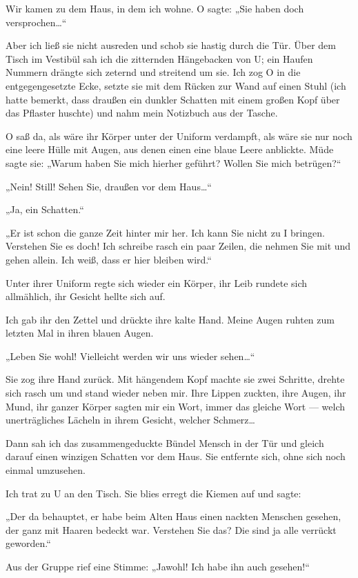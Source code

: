 Wir kamen zu dem Haus, in dem ich wohne. O
sagte: „Sie haben doch versprochen\ldots{}“

Aber ich ließ sie nicht ausreden und schob sie hastig durch die
Tür. Über dem Tisch im Vestibül sah ich die zitternden Hängebacken
von U; ein Haufen Nummern drängte sich zeternd und streitend um
sie. Ich zog O in die entgegengesetzte Ecke, setzte sie mit dem
Rücken zur Wand auf einen Stuhl (ich hatte bemerkt, dass draußen
ein dunkler Schatten mit einem großen Kopf über das Pflaster
huschte) und nahm mein Notizbuch aus der Tasche.

O saß da, als wäre
ihr Körper unter der Uniform verdampft, als wäre sie nur noch eine
leere Hülle mit Augen, aus denen einen eine blaue Leere anblickte.
Müde sagte sie: „Warum haben Sie mich hierher geführt? Wollen Sie
mich betrügen?“

„Nein! Still! Sehen Sie, draußen vor dem Haus\ldots{}“

„Ja, ein Schatten.“

„Er ist schon die ganze Zeit hinter mir her. Ich kann Sie nicht zu
I bringen. Verstehen Sie es doch! Ich schreibe rasch ein paar
Zeilen, die nehmen Sie mit und gehen allein. Ich weiß, dass er hier
bleiben wird.“

Unter ihrer Uniform regte sich wieder ein Körper,
ihr Leib rundete sich allmählich, ihr Gesicht hellte sich auf.

Ich gab ihr den Zettel und drückte ihre kalte Hand. Meine Augen
ruhten zum letzten Mal in ihren blauen Augen.

„Leben Sie wohl! Vielleicht werden wir uns wieder sehen\ldots{}“

Sie zog ihre Hand zurück. Mit hängendem Kopf machte sie zwei
Schritte, drehte sich rasch um und stand wieder neben mir. Ihre
Lippen zuckten, ihre Augen, ihr Mund, ihr ganzer Körper sagten mir
ein Wort, immer das gleiche Wort — welch unerträgliches Lächeln in
ihrem Gesicht, welcher Schmerz\ldots{}

Dann sah ich das zusammengeduckte Bündel Mensch in der Tür und
gleich darauf einen winzigen Schatten vor dem Haus. Sie entfernte
sich, ohne sich noch einmal umzusehen.

Ich trat zu U an den Tisch. Sie blies erregt die Kiemen auf und
sagte:

„Der da behauptet, er habe beim Alten Haus einen nackten Menschen
gesehen, der ganz mit Haaren bedeckt war. Verstehen Sie das? Die
sind ja alle verrückt geworden.“

Aus der Gruppe rief eine Stimme: „Jawohl! Ich habe ihn auch
gesehen!“

